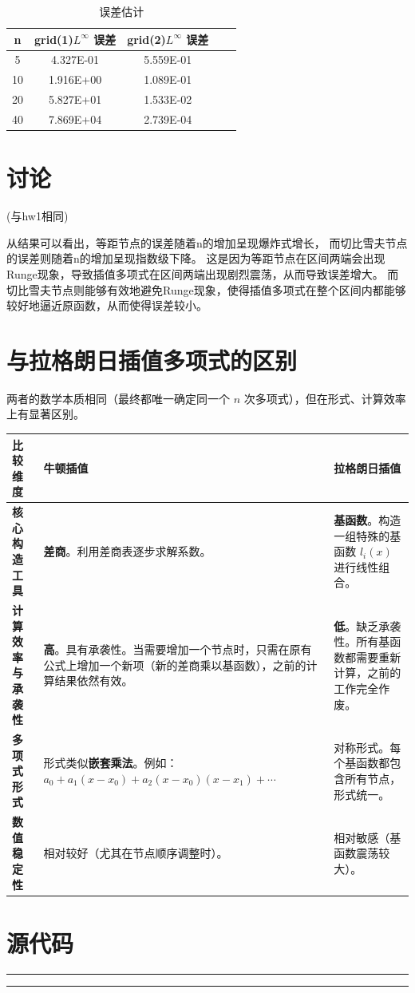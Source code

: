 \documentclass{article}
\begin{document}
\begin{table}[htb]
\caption{\label{table.label} 误差估计} \centering
\bigskip
\begin{small}
\begin{tabular}{|c|cc|cc|}
  \hline
  n & grid(1)$ L^\infty$ 误差 & grid(2)$ L^\infty$ 误差 \\\hline
5 &   4.327E-01  &  5.559E-01\\
10&   1.916E+00  &  1.089E-01\\
20&   5.827E+01  &  1.533E-02\\
40&   7.869E+04  &  2.739E-04\\\hline
\end{tabular}
\end{small}
\end{table}

\newpage
\section{讨论}

(与hw1相同)

从结果可以看出，等距节点的误差随着n的增加呈现爆炸式增长，
而切比雪夫节点的误差则随着n的增加呈现指数级下降。
这是因为等距节点在区间两端会出现Runge现象，导致插值多项式在区间两端出现剧烈震荡，从而导致误差增大。
而切比雪夫节点则能够有效地避免Runge现象，使得插值多项式在整个区间内都能够较好地逼近原函数，从而使得误差较小。

\section{与拉格朗日插值多项式的区别}

两者的数学本质相同（最终都唯一确定同一个 \(n\) 次多项式），但在形式、计算效率上有显著区别。

\begin{table}[h!]
\centering
\begin{tabular}{|p{4cm}|p{5cm}|p{5cm}|}
\hline
\textbf{比较维度} & \textbf{牛顿插值} & \textbf{拉格朗日插值} \\
\hline
\textbf{核心构造工具} & \textbf{差商}。利用差商表逐步求解系数。 & \textbf{基函数}。构造一组特殊的基函数 \(l_i(x)\) 进行线性组合。 \\
\hline
\textbf{计算效率与承袭性} & \textbf{高}。具有承袭性。当需要增加一个节点时，只需在原有公式上增加一个新项（新的差商乘以基函数），之前的计算结果依然有效。 & \textbf{低}。缺乏承袭性。所有基函数都需要重新计算，之前的工作完全作废。 \\
\hline
\textbf{多项式形式} & 形式类似\textbf{嵌套乘法}。例如：\(a_0 + a_1(x-x_0) + a_2(x-x_0)(x-x_1) + \cdots\) & 对称形式。每个基函数都包含所有节点，形式统一。 \\
\hline
\textbf{数值稳定性} & 相对较好（尤其在节点顺序调整时）。 & 相对敏感（基函数震荡较大）。 \\
\hline
\end{tabular}
\end{table}


\appendix
\section{源代码}


\small \hrule  \hrule
\end{document}
